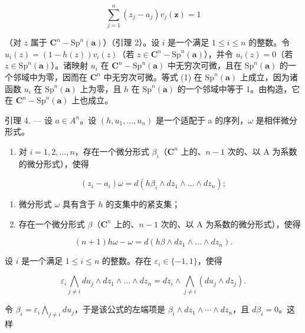 \[
\sum_ {j = 1} ^ {n} (z _ {j} - a _ {j}) v _ {j} (\boldsymbol {z}) = 1
\]

（对 \(z\) 属于 \(\mathbf{C}^n - \mathrm{Sp}^n(\boldsymbol{a})\)）（引理 2）。设 \(i\) 是一个满足 \(1 \leqslant i \leqslant n\) 的整数。令 \(u_i(z) = (1 - h(z))v_i(z)\)（若 \(z \in \mathbf{C}^n - \mathrm{Sp}^n(\boldsymbol{a})\)），并令 \(u_i(z) = 0\)（若 \(z \in \mathrm{Sp}^n(\boldsymbol{a})\)）。诸映射 \(u_i\) 在 \(\mathbf{C}^n - \mathrm{Sp}^n(\boldsymbol{a})\) 中无穷次可微，且在 \(\mathrm{Sp}^n(\boldsymbol{a})\) 的一个邻域中为零，因而在 \(\mathbf{C}^n\) 中无穷次可微。等式 (1) 在 \(\mathrm{Sp}^n(\boldsymbol{a})\) 上成立，因为诸函数 \(u_i\) 在 \(\mathrm{Sp}^n(\boldsymbol{a})\) 上为零，且 \(h\) 在 \(\mathrm{Sp}^n(\boldsymbol{a})\) 的一个邻域中等于 1。由构造，它在 \(\mathbf{C}^n - \mathrm{Sp}^n(\boldsymbol{a})\) 上也成立。

引理 4. — 设 \(a \in A^{n}\)。设 \((h, u_{1}, \ldots, u_{n})\) 是一个适配于 a 的序列，\(\omega\) 是相伴微分形式。

\begin{enumerate}
\def\labelenumi{\alph{enumi})}
\tightlist
\item
  对 \(i = 1,2,\ldots,n\)，存在一个微分形式 \(\beta_{i}\)（\(\mathbf{C}^{n}\) 上的、\(n - 1\) 次的、以 A 为系数的微分形式），使得
\end{enumerate}

\[
(z _ {i} - a _ {i}) \omega = d (h \beta_ {i} \wedge d z _ {1} \wedge \dots \wedge d z _ {n});
\]

\begin{enumerate}
\def\labelenumi{\alph{enumi})}
\setcounter{enumi}{1}
\item
  微分形式 \(\omega\) 具有含于 \(h\) 的支集中的紧支集；
\item
  存在一个微分形式 \(\beta\)（\(\mathbf{C}^{n}\) 上的、\(n - 1\) 次的、以 A 为系数的微分形式），使得
\end{enumerate}

\[
(n + 1) h \omega - \omega = d (h \beta \wedge d z _ {1} \wedge \dots \wedge d z _ {n}).
\]

设 \(i\) 是一个满足 \(1 \leqslant i \leqslant n\) 的整数。存在 \(\varepsilon_i \in \{-1, 1\}\)，使得

\[
\varepsilon_ {i} \bigwedge_ {j \neq i} d u _ {j} \wedge d z _ {1} \wedge \dots \wedge d z _ {n} = d z _ {i} \wedge \bigwedge_ {j \neq i} (d u _ {j} \wedge d z _ {j}).
\]

令 \(\beta_{i} = \varepsilon_{i} \bigwedge_{j \neq i} du_{j}\)，于是该公式的左端项是 \(\beta_{i} \wedge dz_{1} \wedge \cdots \wedge dz_{n}\)，且 \(d\beta_{i} = 0\)。这样

